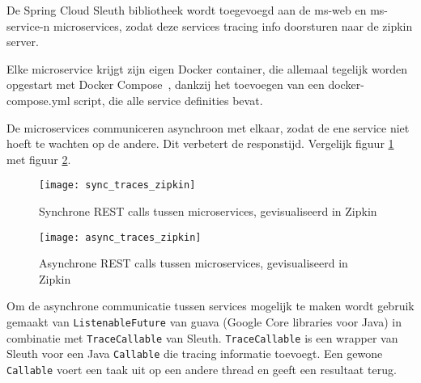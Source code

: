 De Spring Cloud Sleuth bibliotheek wordt toegevoegd aan de ms-web en ms-service-n microservices, zodat deze services tracing info doorsturen naar de zipkin server.

Elke microservice krijgt zijn eigen Docker container, die allemaal tegelijk worden opgestart met Docker Compose~\autocite{DockerCompose2015}, dankzij het toevoegen van een docker-compose.yml script, die alle service definities bevat.

De microservices communiceren asynchroon met elkaar, zodat de ene service niet hoeft te wachten op de andere. Dit verbetert de responstijd. Vergelijk figuur \ref{fig:sync_rest} met figuur \ref{fig:async_rest}.

\begin{figure}
\caption{Synchrone REST calls tussen microservices, gevisualiseerd in Zipkin}
\centering
\texttt{[image: sync\_traces\_zipkin]}
\label{fig:sync_rest}
\end{figure}

\begin{figure}
\caption{Asynchrone REST calls tussen microservices, gevisualiseerd in Zipkin}
\centering
\texttt{[image: async\_traces\_zipkin]}
\label{fig:async_rest}
\end{figure} 

Om de asynchrone communicatie tussen services mogelijk te maken wordt gebruik gemaakt van \texttt{ListenableFuture} van guava (Google Core libraries voor Java) in combinatie met \texttt{TraceCallable} van Sleuth. \texttt{TraceCallable} is een wrapper van Sleuth voor een Java \texttt{Callable} die tracing informatie toevoegt. Een gewone \texttt{Callable} voert een taak uit op een andere thread en geeft een resultaat terug.

